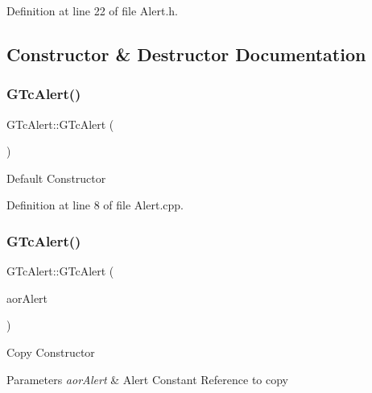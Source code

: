 Definition at line 22 of file Alert.\+h.



\subsection{Constructor \& Destructor Documentation}
\mbox{\label{class_g_n_common_1_1_g_tc_alert_ab4874dff7fccf2444439e7e5e4304125}} 
\subsubsection{\texorpdfstring{G\+Tc\+Alert()}{GTcAlert()}\hspace{0.1cm}{\footnotesize\ttfamily [1/2]}}
{\footnotesize\ttfamily G\+Tc\+Alert\+::\+G\+Tc\+Alert (\begin{DoxyParamCaption}\item[{void}]{ }\end{DoxyParamCaption})}

Default Constructor 

Definition at line 8 of file Alert.\+cpp.

\mbox{\label{class_g_n_common_1_1_g_tc_alert_a90f33fbcc71ed945ab1a0dee83bd3ccc}} 
\subsubsection{\texorpdfstring{G\+Tc\+Alert()}{GTcAlert()}\hspace{0.1cm}{\footnotesize\ttfamily [2/2]}}
{\footnotesize\ttfamily G\+Tc\+Alert\+::\+G\+Tc\+Alert (\begin{DoxyParamCaption}\item[{const \mbox{\hyperlink{class_g_n_common_1_1_g_tc_alert}{G\+Tc\+Alert}} \&}]{aor\+Alert }\end{DoxyParamCaption})}

Copy Constructor 
\begin{DoxyParams}{Parameters}
{\em aor\+Alert} & Alert Constant Reference to copy \\
\hline
\end{DoxyParams}


